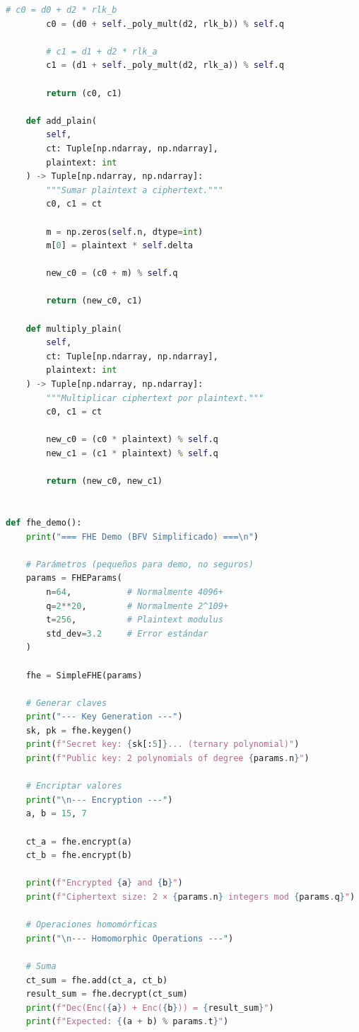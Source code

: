 \documentclass[11pt,a4paper,twoside]{book}
\theoremstyle{definition}
\theoremstyle{remark}
\begin{document}
\begin{lstlisting}[language=Python, caption={Implementación conceptual de FHE (BFV simplificado)}]
        # c0 = d0 + d2 * rlk_b
        c0 = (d0 + self._poly_mult(d2, rlk_b)) % self.q
        
        # c1 = d1 + d2 * rlk_a
        c1 = (d1 + self._poly_mult(d2, rlk_a)) % self.q
        
        return (c0, c1)
    
    def add_plain(
        self,
        ct: Tuple[np.ndarray, np.ndarray],
        plaintext: int
    ) -> Tuple[np.ndarray, np.ndarray]:
        """Sumar plaintext a ciphertext."""
        c0, c1 = ct
        
        m = np.zeros(self.n, dtype=int)
        m[0] = plaintext * self.delta
        
        new_c0 = (c0 + m) % self.q
        
        return (new_c0, c1)
    
    def multiply_plain(
        self,
        ct: Tuple[np.ndarray, np.ndarray],
        plaintext: int
    ) -> Tuple[np.ndarray, np.ndarray]:
        """Multiplicar ciphertext por plaintext."""
        c0, c1 = ct
        
        new_c0 = (c0 * plaintext) % self.q
        new_c1 = (c1 * plaintext) % self.q
        
        return (new_c0, new_c1)


def fhe_demo():
    print("=== FHE Demo (BFV Simplificado) ===\n")
    
    # Parámetros (pequeños para demo, no seguros)
    params = FHEParams(
        n=64,           # Normalmente 4096+
        q=2**20,        # Normalmente 2^109+
        t=256,          # Plaintext modulus
        std_dev=3.2     # Error estándar
    )
    
    fhe = SimpleFHE(params)
    
    # Generar claves
    print("--- Key Generation ---")
    sk, pk = fhe.keygen()
    print(f"Secret key: {sk[:5]}... (ternary polynomial)")
    print(f"Public key: 2 polynomials of degree {params.n}")
    
    # Encriptar valores
    print("\n--- Encryption ---")
    a, b = 15, 7
    
    ct_a = fhe.encrypt(a)
    ct_b = fhe.encrypt(b)
    
    print(f"Encrypted {a} and {b}")
    print(f"Ciphertext size: 2 × {params.n} integers mod {params.q}")
    
    # Operaciones homomórficas
    print("\n--- Homomorphic Operations ---")
    
    # Suma
    ct_sum = fhe.add(ct_a, ct_b)
    result_sum = fhe.decrypt(ct_sum)
    print(f"Dec(Enc({a}) + Enc({b})) = {result_sum}")
    print(f"Expected: {(a + b) % params.t}")
    

\end{lstlisting}
\end{document}
